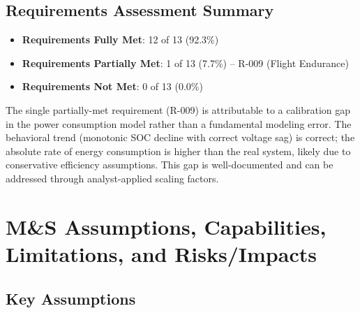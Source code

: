 \documentclass[11pt, letterpaper]{article}
\begin{document}
\subsection{\unclass Requirements Assessment Summary}

\begin{itemize}
    \item \unclass \textbf{Requirements Fully Met}: 12 of 13 (92.3\%)
    \item \unclass \textbf{Requirements Partially Met}: 1 of 13 (7.7\%) -- R-009 (Flight Endurance)
    \item \unclass \textbf{Requirements Not Met}: 0 of 13 (0.0\%)
\end{itemize}

\unclass The single partially-met requirement (R-009) is attributable to a calibration gap in the power consumption model rather than a fundamental modeling error. The behavioral trend (monotonic SOC decline with correct voltage sag) is correct; the absolute rate of energy consumption is higher than the real system, likely due to conservative efficiency assumptions. This gap is well-documented and can be addressed through analyst-applied scaling factors.

\pagebreak


\section{\unclass M\&S Assumptions, Capabilities, Limitations, and Risks/Impacts}

\subsection{\unclass Key Assumptions}
\end{document}
